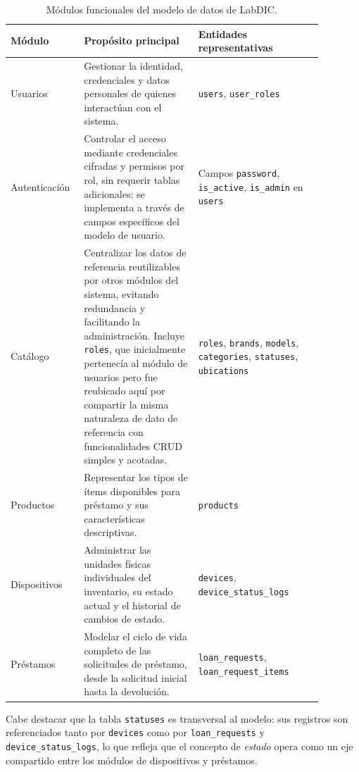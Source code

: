 \begin{table}[H]
	\centering
	\begin{tabular}{p{0.17\linewidth}p{0.34\linewidth}p{0.37\linewidth}}
		\hline
		\textbf{Módulo} & \textbf{Propósito principal} & \textbf{Entidades representativas} \\
		\hline
		Usuarios & Gestionar la identidad, credenciales y datos personales de quienes 
		interactúan con el sistema.
		& \texttt{users}, \texttt{user\_roles} \\
		\hline
		Autenticación & Controlar el acceso mediante credenciales cifradas y permisos 
		por rol, sin requerir tablas adicionales: se implementa a través de campos 
		específicos del modelo de usuario.
		& Campos \texttt{password}, \texttt{is\_active}, \texttt{is\_admin} en \texttt{users} \\
		\hline
		Catálogo & Centralizar los datos de referencia reutilizables por otros módulos 
		del sistema, evitando redundancia y facilitando la administración. Incluye 
		\texttt{roles}, que inicialmente pertenecía al módulo de usuarios pero fue 
		reubicado aquí por compartir la misma naturaleza de dato de referencia con 
		funcionalidades CRUD simples y acotadas.
		& \texttt{roles}, \texttt{brands}, \texttt{models}, \texttt{categories}, 
		\texttt{statuses}, \texttt{ubications} \\
		\hline
		Productos & Representar los tipos de ítems disponibles para préstamo y sus 
		características descriptivas.
		& \texttt{products} \\
		\hline
		Dispositivos & Administrar las unidades físicas individuales del inventario, 
		su estado actual y el historial de cambios de estado.
		& \texttt{devices}, \texttt{device\_status\_logs} \\
		\hline
		Préstamos & Modelar el ciclo de vida completo de las solicitudes de préstamo, 
		desde la solicitud inicial hasta la devolución.
		& \texttt{loan\_requests}, \texttt{loan\_request\_items} \\
		\hline
	\end{tabular}
	\caption{Módulos funcionales del modelo de datos de LabDIC.}
	\label{tab:grandes_grupos_funcionales}
\end{table}

Cabe destacar que la tabla \texttt{statuses} es transversal al modelo: sus registros 
son referenciados tanto por \texttt{devices} como por \texttt{loan\_requests} y 
\texttt{device\_status\_logs}, lo que refleja que el concepto de \textit{estado} 
opera como un eje compartido entre los módulos de dispositivos y préstamos.

